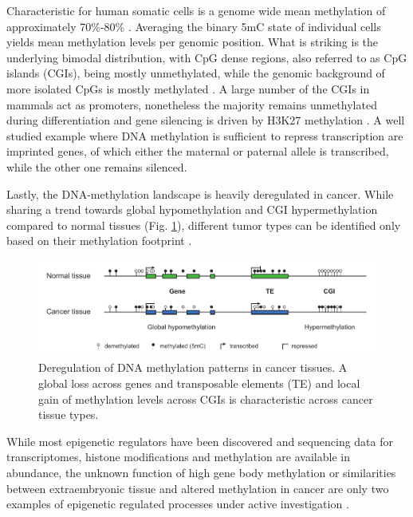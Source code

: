 Characteristic for human somatic cells is a genome wide mean methylation of approximately 70\%-80\% \cite{Bird2002}. Averaging the binary 5mC state of individual cells yields mean methylation levels per genomic position. What is striking is the underlying bimodal distribution, with CpG dense regions, also referred to as CpG islands (CGIs), being mostly unmethylated, while the genomic background of more isolated CpGs is mostly methylated \cite{Bird2002}.
A large number of the CGIs in mammals act as promoters, nonetheless the majority remains unmethylated during differentiation and gene silencing is driven by H3K27 methylation \cite{Larsen1992, Greenberg2019}.
A well studied example where DNA methylation is sufficient to repress transcription are imprinted genes, of which either the maternal or paternal allele is transcribed, while the other one remains silenced.

Lastly, the DNA-methylation landscape is heavily deregulated in cancer. While sharing a trend towards global hypomethylation and CGI hypermethylation compared to normal tissues (Fig. \ref{fig:intro:cancer}), different tumor types can be identified only based on their methylation footprint \cite{Capper2018}.

\begin{figure}[h]
	\centering
	\includegraphics[width=1.0\textwidth]{figures/intro/cancer.pdf}
	\captionsetup{format=plain}
	\caption[DNA methylation in cancer]{Deregulation of DNA methylation patterns in cancer tissues. A global loss across genes and transposable elements (TE) and local gain of methylation levels across CGIs is characteristic across cancer tissue types.}
	\label{fig:intro:cancer}
\end{figure}

While most epigenetic regulators have been discovered and sequencing data for transcriptomes, histone modifications and methylation are available in abundance, the unknown function of high gene body methylation or similarities between extraembryonic tissue and altered methylation in cancer are only two examples of epigenetic regulated processes under active investigation \cite{McGuire2020}.





